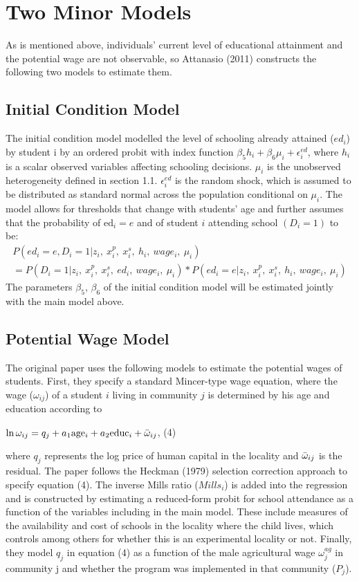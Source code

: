\documentclass{handoutForSolutions}
\begin{document}
\newpage
\section{Two Minor Models}
As is mentioned above, individuals' current level of educational attainment and the potential wage are not observable, so Attanasio (2011) constructs the following two models to estimate them.
\subsection{Initial Condition Model}
The initial condition model modelled the level of schooling already attained ($ed_i$) by student i by an ordered probit with index function $\beta_5 h_i+\beta_6 \mu_i+\epsilon^{ed}_i$, where $h_i$ is a scalar observed variables affecting schooling decisions. $\mu_i$ is the unobserved heterogeneity defined in section 1.1. $\epsilon^{ed}_i$ is the random shock, which is assumed to be distributed as standard normal across the population conditional on $\mu_i$. The model allows for thresholds that change with students' age and further assumes that the probability of $\mathrm{e}\mathrm{d}_{i}=e$ and of student $i$ attending school $(D_i=1)$ to be:
\begin{gather*}
        P(ed_i=e, D_i=1|z_i,\ x_i^p,\ x_i^s,\ h_i,\  wage_i,\ \mu_i)\\= P(D_i=1|z_i,\ x_i^p,\ x_i^s,\ ed_i,\  wage_i,\ \mu_i)*P(ed_i=e|z_i,\ x_i^p,\ x_i^s,\ h_i,\  wage_i,\ \mu_i)
\end{gather*}
The parameters $\beta_5$, $\beta_6$ of the initial condition model will be estimated jointly with the main model above.
\subsection{Potential Wage Model}
The original paper uses the following models to estimate the potential wages of students. First, they specify a standard Mincer-type wage equation, where the wage ($\omega_{ij}$) of a student $i$ living in community $j$ is determined by his age and education according to
\begin{center}
$\ln\omega_{ij}=q_{j}+a_1\mathrm{a}\mathrm{g}\mathrm{e}_{i}+a_2\mathrm{e}\mathrm{d}\mathrm{u}\mathrm{c}_{i}+\Bar{\omega}_{ij}$,   (4)
\end{center}
where $q_{j}$ represents the log price of human capital in the locality and $\Bar{\omega}_{ij}$ is the residual. The paper follows the Heckman (1979) selection correction approach to specify equation (4). The inverse Mills ratio ($Mills_i$) is added into the regression and is constructed by estimating a reduced-form probit for school attendance as a function of the variables including in the main model. These include measures of the availability and cost of schools in the locality where the child lives, which controls among others for whether this is an experimental locality or not. Finally, they model $q_{j}$ in equation (4) as a function of the male agricultural wage $\omega^{ag}_j$ in community j and whether the program was implemented in that community ($P_j$).\\ 
\end{document}
